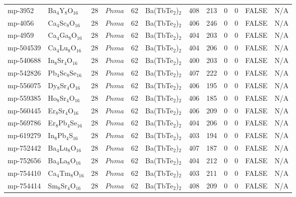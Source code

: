 {\begin{longtable}{llcccccccccc}
    mp-3952 & Ba$_{4}$Y$_{8}$O$_{16}$ & 28    & $Pnma$ & 62    & Ba(TbTe$_{2}$)$_{2}$ & 408   & 213   & 0     & 0     & FALSE & N/A \\
    mp-4056 & Ca$_{4}$Sc$_{8}$O$_{16}$ & 28    & $Pnma$ & 62    & Ba(TbTe$_{2}$)$_{2}$ & 406   & 246   & 0     & 0     & FALSE & N/A \\
    mp-4959 & Ca$_{4}$Ga$_{8}$O$_{16}$ & 28    & $Pnma$ & 62    & Ba(TbTe$_{2}$)$_{2}$ & 404   & 203   & 0     & 0     & FALSE & N/A \\
    mp-504539 & Ca$_{4}$Lu$_{8}$O$_{16}$ & 28    & $Pnma$ & 62    & Ba(TbTe$_{2}$)$_{2}$ & 404   & 206   & 0     & 0     & FALSE & N/A \\
    mp-540688 & In$_{8}$Sr$_{4}$O$_{16}$ & 28    & $Pnma$ & 62    & Ba(TbTe$_{2}$)$_{2}$ & 400   & 203   & 0     & 0     & FALSE & N/A \\
    mp-542826 & Pb$_{4}$Sc$_{8}$Se$_{16}$ & 28    & $Pnma$ & 62    & Ba(TbTe$_{2}$)$_{2}$ & 407   & 222   & 0     & 0     & FALSE & N/A \\
    mp-556075 & Dy$_{8}$Sr$_{4}$O$_{16}$ & 28    & $Pnma$ & 62    & Ba(TbTe$_{2}$)$_{2}$ & 406   & 195   & 0     & 0     & FALSE & N/A \\
    mp-559385 & Ho$_{8}$Sr$_{4}$O$_{16}$ & 28    & $Pnma$ & 62    & Ba(TbTe$_{2}$)$_{2}$ & 406   & 185   & 0     & 0     & FALSE & N/A \\
    mp-560445 & Er$_{8}$Sr$_{4}$O$_{16}$ & 28    & $Pnma$ & 62    & Ba(TbTe$_{2}$)$_{2}$ & 406   & 209   & 0     & 0     & FALSE & N/A \\
    mp-569786 & Er$_{8}$Pb$_{4}$Se$_{16}$ & 28    & $Pnma$ & 62    & Ba(TbTe$_{2}$)$_{2}$ & 404   & 206   & 0     & 0     & FALSE & N/A \\
    mp-619279 & In$_{8}$Pb$_{4}$S$_{16}$ & 28    & $Pnma$ & 62    & Ba(TbTe$_{2}$)$_{2}$ & 403   & 194   & 0     & 0     & FALSE & N/A \\
    mp-752442 & Ba$_{4}$Lu$_{8}$O$_{16}$ & 28    & $Pnma$ & 62    & Ba(TbTe$_{2}$)$_{2}$ & 407   & 187   & 0     & 0     & FALSE & N/A \\
    mp-752656 & Ba$_{4}$La$_{8}$O$_{16}$ & 28    & $Pnma$ & 62    & Ba(TbTe$_{2}$)$_{2}$ & 404   & 212   & 0     & 0     & FALSE & N/A \\
    mp-754410 & Ca$_{4}$Tm$_{8}$O$_{16}$ & 28    & $Pnma$ & 62    & Ba(TbTe$_{2}$)$_{2}$ & 403   & 211   & 0     & 0     & FALSE & N/A \\
    mp-754414 & Sm$_{8}$Sr$_{4}$O$_{16}$ & 28    & $Pnma$ & 62    & Ba(TbTe$_{2}$)$_{2}$ & 408   & 209   & 0     & 0     & FALSE & N/A \\

\end{longtable}}
